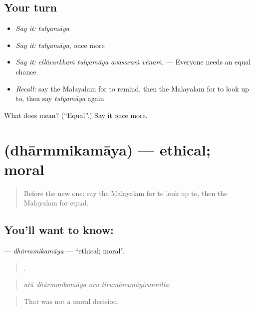 \subsection*{Your turn}
\begin{itemize}
\raggedright
  \item \emph{Say it:} \emph{tulyamāya}
  \item \emph{Say it:} \emph{tulyamāya}, once more
  \item \emph{Say it:} \emph{ellāvarkkuṁ tulyamāya avasaraṁ vēṇaṁ.} — Everyone needs an equal chance.
  \item \emph{Recall:} say the Malayalam for to remind, then the Malayalam for to look up to, then say \emph{tulyamāya} again
\end{itemize}

\begin{tcolorbox}[breakable,colback=teal!4,colframe=teal!35!black,title={Before you move on}]
What does  mean? (\textquotedblleft{}Equal\textquotedblright{}.) Say it once more.
\end{tcolorbox}
\section[\texorpdfstring{\ml{ധാർമ്മികമായ} (dhārmmikamāya)}{ധാർമ്മികമായ (dhārmmikamāya)}]{ (dhārmmikamāya) — ethical; moral}

\label{lesson:ML-C455-dharmmikamaya}



\begin{quote}
Before the new one: say the Malayalam for to look up to, then the Malayalam for equal.
\end{quote}

\subsection*{You'll want to know: }
\textbf{} — \emph{dhārmmikamāya} — \textquotedblleft{}ethical; moral\textquotedblright{}.

\begin{quote}
   .
\end{quote}

\begin{quote}
\emph{atŭ dhārmmikamāya oru tīrumānamāyirunnilla.}
\end{quote}

\begin{quote}
That was not a moral decision.
\end{quote}

